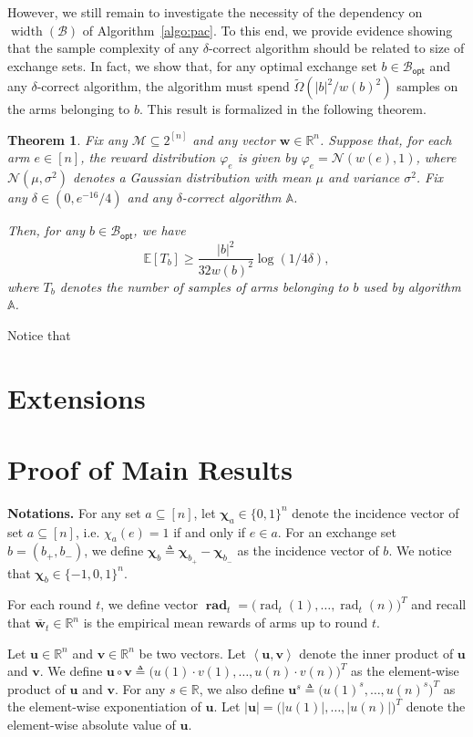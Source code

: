 \documentclass{article}
\newtheorem{theorem}{Theorem}
\newcommand{\Rew}{\varphi}
\newcommand{\E}{\mathbb E}
\newcommand{\M}{\mathcal M}
\newcommand{\B}{\mathcal B}
\newcommand{\RR}{\mathbb R}
\newcommand{\Bopt}{\mathcal B_{\mathsf{opt}}}
\DeclareMathOperator{\rank}{width}
\DeclareMathOperator{\rad}{rad}
\newcommand{\inn}[1]{\left\langle #1 \right\rangle}
\renewcommand{\vec}[1]{\boldsymbol{#1}}
\renewcommand{\odot}{\circ}
\begin{document}
\begin{spacing}{1.1}
However, we still remain to investigate the necessity of the dependency on $\rank(\B)$ of Algorithm~\ref{algo:pac}.
To this end, we provide evidence showing that the sample complexity of any $\delta$-correct algorithm should be related to size of exchange sets.
In fact, we show that, for any optimal exchange set $b\in\Bopt$ and any $\delta$-correct algorithm, the algorithm  must spend $\tilde \Omega\left(|b|^2/w(b)^2\right)$ samples on the arms belonging to $b$.
This result is formalized in the following theorem.
\begin{theorem}
Fix any $\M\subseteq 2^{[n]}$ and any vector $\vec w \in \RR^n$.
Suppose that, for each arm $e\in [n]$, the reward distribution $\Rew_e$ is given by $\Rew_e=\mathcal N(w(e),1)$, where $\mathcal N(\mu, \sigma^2)$ denotes a Gaussian distribution with mean $\mu$ and variance $\sigma^2$. 
Fix any $\delta \in (0,e^{-16}/4)$
and any $\delta$-correct algorithm $\mathbb A$.

Then, for any $b \in \Bopt$, we have
$$
\E[T_b] \ge \frac{|b|^2}{32w(b)^2}\log(1/4\delta),
$$
where $T_b$ denotes the number of samples of arms belonging to $b$ used by algorithm $\mathbb A$.
\end{theorem}
Notice that 


\section{Extensions}




\section{Proof of Main Results}


\textbf{Notations.} 
For any set $a\subseteq [n]$, let $\vec \chi_a \in \{0,1\}^n$ denote the incidence vector of set $a \subseteq [n]$, i.e. $\chi_a(e) = 1$ if and only if $e\in a$.
For an exchange set $b=(b_+,b_-)$, we define $\vec \chi_b \triangleq \vec \chi_{b_+}- \vec \chi_{b_-}$ as the incidence vector of $b$.
We notice that $\vec \chi_b \in \{-1,0,1\}^n$.

For each round $t$, we define vector $\vec\rad_t = \big(\rad_t(1),\ldots,\rad_t(n)\big)^T$ and recall that $\vec {\bar w}_t\in \RR^n$ is the empirical mean rewards of arms up to round $t$.

Let $\vec u\in \RR^n$ and $\vec v\in \RR^n$ be two vectors.
Let $\inn{\vec u, \vec v}$ denote the inner product of $\vec u$ and $\vec v$.
We define $\vec u \odot \vec v \triangleq \big(u(1)\cdot v(1),\ldots,u(n)\cdot v(n)\big)^T$ as the element-wise product of $\vec u$ and $\vec v$.
For any $s\in \RR$, we also define $\vec u^s \triangleq \big(u(1)^s, \ldots, u(n)^s)^T$ as the element-wise exponentiation of $\vec u$.
Let $|\vec u| = \big(|u(1)|, \ldots, |u(n)|\big)^T$ denote the element-wise absolute value of $\vec u$.




\end{spacing}
\end{document}
